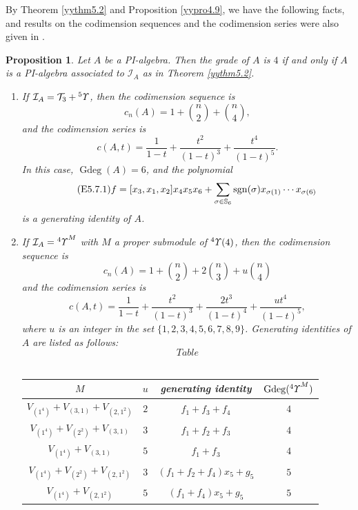 \documentclass{amsart}
\newtheorem{prop}[thm]{Proposition}
\theoremstyle{definition}
\theoremstyle{remark}
\numberwithin{equation}{section}
\def\S{\mathbb{S}}
\def\sgn{{\rm sgn}}
\def\gd{\operatorname{Gdeg}}
\newcommand{\up}[1]{{^{#1}{\it \!\Upsilon}}}
\def \I{\mathcal{I}}
\def \S{\mathbb{S}}
\def\T{\mathcal{T}}
\begin{document}
By Theorem \ref{yythm5.2} and Proposition \ref{yypro4.9}, we 
have the following facts, and results on the codimension 
sequences and the codimension series were also given in \cite{OV}.

\begin{prop}
\label{yypro5.7}
Let $A$ be a PI-algebra. Then the grade of $A$ is $4$ 
if and only if $A$ is a PI-algebra associated to $\I_A$
as in Theorem {\rm{\ref{yythm5.2}}}. 
\begin{enumerate}
\item[(1)]
If $\I_A=\T_3+\up{5}$, then the codimension sequence is	
\[c_n(A)=1+{n\choose 2}+{n\choose 4},\]
and the codimension series is 
\[c(A,t)=\frac{1}{1-t}+\frac{t^2}{(1-t)^3}+
\frac{t^4}{(1-t)^5}.\]
In this case, $\gd(A)=6$, and the polynomial
\begin{equation}
\label{E5.7.1}\tag{E5.7.1}
f=[x_3, x_1, x_2]x_4x_5x_6+\sum_{\sigma\in \S_6}
\sgn(\sigma)x_{\sigma(1)}\cdots x_{\sigma(6)}
\end{equation}
is a generating identity of $A$.
\item[(2)] 
If $\I_A=\up{4}^M$ with $M$ a proper submodule of $\up{4}(4)$, 
then the codimension sequence is
\[c_n(A)=1+{n\choose 2}+2{n\choose 3}+u{n\choose 4}\]
and the codimension series is 
\[c(A,t)=\frac{1}{1-t}+\frac{t^2}{(1-t)^3}+
\frac{2t^3}{(1-t)^4}+\frac{ut^4}{(1-t)^5},\]
where $u$ is an integer in the set $\{1,2,3,4,5,6,7,8,9\}$.
Generating identities of $A$ are listed as follows:
\begin{equation}
\label{E5.7.2}\tag{E5.7.2}
Table
\end{equation}
~\begin{center}
\begin{tabular}{|c|c|c|c|}
\hline
$M$                               & $u$ & {\rm generating identity}             & $\gd(\up{4}^M)$ \\ \hline 
$V_{(1^4)}+V_{(3,1)}+V_{(2,1^2)}$ & $2$ & $f_1+f_3+f_4$                     & $4$ \\ \hline
$V_{(1^4)}+V_{(2^2)}+V_{(3,1)}$   & $3$ & $f_1+f_2+f_3$                     & $4$ \\ \hline
$V_{(1^4)}+V_{(3,1)}$             & $5$ & $f_1+f_3$                         & $4$ \\ \hline
$V_{(1^4)}+V_{(2^2)}+V_{(2,1^2)}$ & $3$ & $(f_1+f_2+f_4)x_5+g_5$            & $5$ \\ \hline 
$V_{(1^4)}+V_{(2,1^2)}$           & $5$ & $(f_1+f_4)x_5+g_5$                & $5$ \\ \hline

\end{tabular}
\end{center}
\end{enumerate}
\end{prop}
\end{document}
